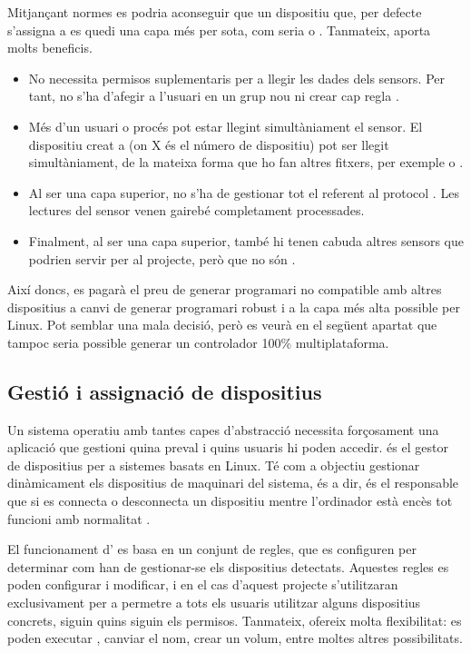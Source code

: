 Mitjançant normes  es podria aconseguir que un dispositiu que, per 
defecte s'assigna a  es quedi una capa més per sota, com seria
 o . Tanmateix,  aporta molts beneficis.

\begin{itemize}
    \item No necessita permisos suplementaris per a llegir les dades dels
    sensors. Per tant, no s'ha d'afegir a l'usuari en un grup nou ni crear
    cap regla .
    \item Més d'un usuari o procés pot estar llegint simultàniament el sensor.
    El dispositiu creat a  (on X és el número de
    dispositiu) pot ser llegit simultàniament, de la mateixa forma que ho fan
    altres fitxers, per exemple  o .
    \item Al ser una capa superior, no s'ha de gestionar tot el referent al
    protocol . Les lectures del sensor venen gairebé completament
    processades.
    \item Finalment, al ser una capa superior, també hi tenen cabuda altres
    sensors que podrien servir per al projecte, però que no són .
\end{itemize}

Així doncs, es pagarà el preu de generar programari no compatible amb altres
dispositius a canvi de generar programari robust i a la capa més alta possible
per Linux. Pot semblar una mala decisió, però es veurà en el següent apartat
que tampoc seria possible generar un controlador 100\% multiplataforma.

\subsection{Gestió i assignació de dispositius}

Un sistema operatiu amb tantes capes d'abstracció necessita forçosament una
aplicació que gestioni quina preval i quins usuaris hi poden accedir.
 és el gestor de dispositius per a sistemes basats en Linux.
Té com a objectiu gestionar dinàmicament els dispositius de maquinari del
sistema, és a dir, és el responsable que si es connecta o desconnecta
un dispositiu mentre l'ordinador està encès tot funcioni amb normalitat \cite{Udev}.

El funcionament d' es basa en un conjunt de regles,
que es configuren per
determinar com han de gestionar-se els dispositius detectats.
Aquestes regles es poden configurar i modificar, i en el cas d'aquest projecte
s'utilitzaran exclusivament per a permetre a tots els usuaris utilitzar alguns
dispositius concrets, siguin quins siguin els permisos. Tanmateix, 
ofereix molta flexibilitat: es poden executar , canviar el nom,
crear un volum, entre moltes altres possibilitats.

